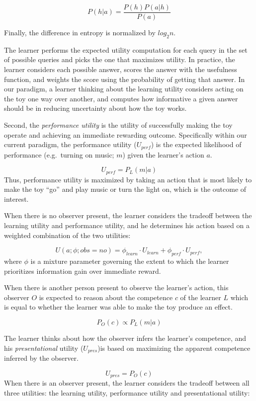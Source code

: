 \documentclass[10pt, letterpaper]{article}
\begin{document}
\[ P(h|a) = \frac{P(h)P(a|h)}{P(a)} \]

\noindent
Finally, the difference in entropy is normalized by \(log_2 n\).

The learner performs the expected utility computation for each query in
the set of possible queries and picks the one that maximizes utility. In
practice, the learner considers each possible answer, scores the answer
with the usefulness function, and weights the score using the
probability of getting that answer. In our paradigm, a learner thinking
about the learning utility considers acting on the toy one way over
another, and computes how informative a given answer should be in
reducing uncertainty about how the toy works.

Second, the \emph{performance utility} is the utility of successfully
making the toy operate and achieving an immediate rewarding outcome.
Specifically within our current paradigm, the performance utility
(\(U_{perf}\)) is the expected likelihood of performance (e.g.~turning
on music; \(m\)) given the learner's action \(a\).

\[ U_{perf} = P_L(m | a) \] \noindent
Thus, performance utility is maximized by taking an action that is most
likely to make the toy ``go'' and play music or turn the light on, which
is the outcome of interest.

When there is no observer present, the learner considers the tradeoff
between the learning utility and performance utility, and he determines
his action based on a weighted combination of the two utilities:

\[ U(a;\phi; obs = no) = \phi_{learn} \cdot U_{learn} + \phi_{perf} \cdot U_{perf} ,\]
\noindent
where \(\phi\) is a mixture parameter governing the extent to which the
learner prioritizes information gain over immediate reward.

When there is another person present to observe the learner's action,
this observer \(O\) is expected to reason about the competence \(c\) of
the learner \(L\) which is equal to whether the learner was able to make
the toy produce an effect.

\[ P_O(c) \propto P_L(m | a)\]

The learner thinks about how the observer infers the learner's
competence, and his \emph{presentational} utility (\(U_{pres}\))is based
on maximizing the apparent competence inferred by the observer.

\[ U_{pres} = P_O(c) \] When there is an observer present, the learner
considers the tradeoff between all three utilities: the learning
utility, performance utility and presentational utility:
\end{document}
